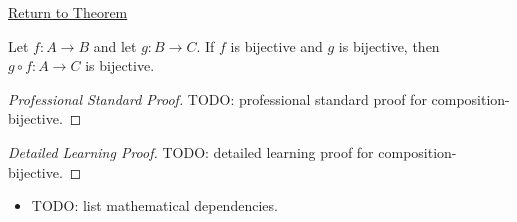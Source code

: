 \newpage
{}
\label{prf:composition-bijective}

\begin{remark*}[Return]
\hyperref[cor:composition-bijective]{Return to Theorem}
\end{remark*}

\begin{theorem*}
Let $f:A\to B$ and let $g:B\to C$. If $f$ is bijective and $g$ is
bijective, then $g\circ f:A\to C$ is bijective.

\smallskip\noindent
\end{theorem*}

\begin{proof}[Professional Standard Proof]
\LRAProofBodyStart
TODO: professional standard proof for composition-bijective.
\end{proof}

\begin{proof}[Detailed Learning Proof]
\LRAProofBodyStart
TODO: detailed learning proof for composition-bijective.
\end{proof}

\begin{remark*}
\end{remark*}

\begin{dependencies}
\begin{itemize}
  \item TODO: list mathematical dependencies.
\end{itemize}
\end{dependencies}

\clearpage
